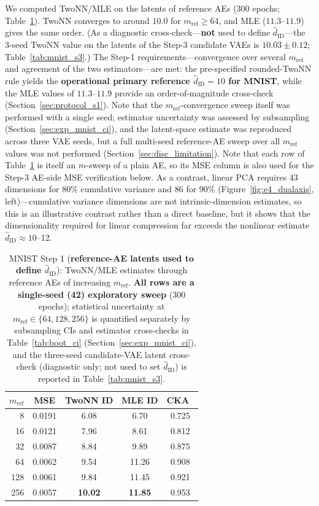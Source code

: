 \documentclass[make,article,submit,pdftex,moreauthors]{Definitions/mdpi}
\newcommand{\hatdID}{\hat{d}_{\mathrm{ID}}}
\begin{document}
We computed TwoNN/MLE on the latents of reference AEs (300 epochs;
Table~\ref{tab:mnist_s1}).
TwoNN converges to around $10.0$ for $m_{\mathrm{ref}} \geq 64$, and MLE
($11.3$--$11.9$) gives the same order.
(As a diagnostic cross-check---\textbf{not} used to define $\hatdID$---the
3-seed TwoNN value on the latents of the Step-3 candidate VAEs is
$10.03 \pm 0.12$; Table~\ref{tab:mnist_s3}.)
The Step-1 requirements---convergence over several $m_{\mathrm{ref}}$ and
agreement of the two estimators---are met: the pre-specified rounded-TwoNN
rule yields the \textbf{operational primary reference $\hatdID = 10$ for
MNIST}, while the MLE values of $11.3$--$11.9$ provide an
order-of-magnitude cross-check
(Section~\ref{sec:protocol_s1}).
Note that the $m_{\mathrm{ref}}$-convergence sweep itself was performed
with a single seed; estimator uncertainty was assessed by subsampling
(Section~\ref{sec:exp_mnist_ci}), and the latent-space estimate was
reproduced across three VAE seeds, but a full multi-seed reference-AE sweep
over all $m_{\mathrm{ref}}$ values was not performed
(Section~\ref{sec:disc_limitation}).
Note that each row of Table~\ref{tab:mnist_s1} is itself an $m$-sweep of a
plain AE, so its MSE column is also used for the Step-3 AE-side MSE
verification below.
As a contrast, linear PCA requires 43 dimensions for 80\% cumulative
variance and 86 for 90\% (Figure~\ref{fig:e4_dualaxis}, left)---cumulative
variance dimensions are not intrinsic-dimension estimates, so this is an
illustrative contrast rather than a direct baseline, but it shows that the
dimensionality required for linear compression far exceeds the nonlinear
estimate $\hatdID \approx 10$--12.

\begin{table}[H]
\caption{MNIST Step 1 (\textbf{reference-AE latents used to define
$\hatdID$}): TwoNN/MLE estimates through reference AEs of
increasing $m_{\mathrm{ref}}$. \textbf{All rows are a single-seed (42)
exploratory sweep} (300 epochs); statistical uncertainty at
$m_{\mathrm{ref}} \in \{64, 128, 256\}$ is quantified separately by
subsampling CIs and estimator cross-checks in Table~\ref{tab:boot_ci}
(Section~\ref{sec:exp_mnist_ci}), and the three-seed candidate-VAE latent
cross-check (diagnostic only; not used to set $\hatdID$) is reported in
Table~\ref{tab:mnist_s3}.}
\label{tab:mnist_s1}
\small
\begin{tabular}{rcccc}
\toprule
$m_{\mathrm{ref}}$ & \textbf{MSE} & \textbf{TwoNN ID} & \textbf{MLE ID} & \textbf{CKA}~\cite{kornblith2019cka} \\
\midrule
8   & 0.0191 & 6.08 & 6.70 & 0.725 \\
16  & 0.0121 & 7.96 & 8.61 & 0.812 \\
32  & 0.0087 & 8.84 & 9.89 & 0.875 \\
64  & 0.0062 & 9.54 & 11.26 & 0.908 \\
128 & 0.0061 & 9.84 & 11.45 & 0.921 \\
256 & 0.0057 & \textbf{10.02} & \textbf{11.85} & 0.953 \\
\bottomrule
\end{tabular}
\end{table}
\end{document}
